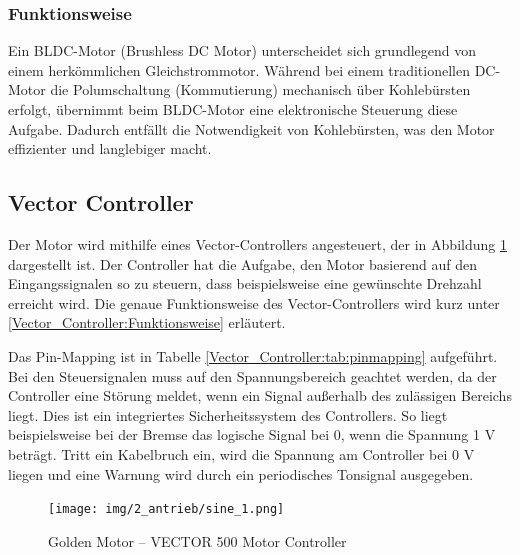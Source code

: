 \pagebreak[4]



\subsubsection*{Funktionsweise}
\label{BLDC_Motor:Funktionsweise}
Ein BLDC-Motor (Brushless DC Motor) unterscheidet sich grundlegend von einem herkömmlichen Gleichstrommotor. Während bei einem traditionellen DC-Motor die Polumschaltung (Kommutierung) mechanisch über Kohlebürsten erfolgt, übernimmt beim BLDC-Motor eine elektronische Steuerung diese Aufgabe. Dadurch entfällt die Notwendigkeit von Kohlebürsten, was den Motor effizienter und langlebiger macht\cite{mathworks:bldc_motor}.
\newpage



\subsection{Vector Controller}
\label{section:Vector_Controller}

Der Motor wird mithilfe eines Vector-Controllers angesteuert, der in Abbildung \ref{Vector_Controller:img:Antrieb_Controller} dargestellt ist. Der Controller hat die Aufgabe, den Motor basierend auf den Eingangssignalen so zu steuern, dass beispielsweise eine gewünschte Drehzahl erreicht wird. Die genaue Funktionsweise des Vector-Controllers wird kurz unter \ref{Vector_Controller:Funktionsweise} erläutert.

Das Pin-Mapping ist in Tabelle \ref{Vector_Controller:tab:pinmapping} aufgeführt. Bei den Steuersignalen muss auf den Spannungsbereich geachtet werden, da der Controller eine Störung meldet, wenn ein Signal außerhalb des zulässigen Bereichs liegt. Dies ist ein integriertes Sicherheitssystem des Controllers. So liegt beispielsweise bei der Bremse das logische Signal bei 0, wenn die Spannung 1 V beträgt. Tritt ein Kabelbruch ein, wird die Spannung am Controller bei 0 V liegen und eine Warnung wird durch ein periodisches Tonsignal ausgegeben.


\begin{figure}[!ht]
	\begin{center}
		\texttt{[image: img/2\_antrieb/sine\_1.png]}
		\caption{Golden Motor – VECTOR 500 Motor Controller}
		\label{Vector_Controller:img:Antrieb_Controller}
	\end{center}
\end{figure}

